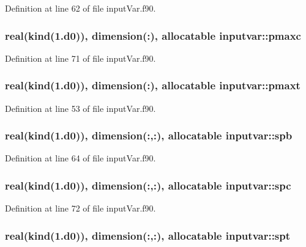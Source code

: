 Definition at line 62 of file input\-Var.\-f90.

\hypertarget{classinputvar_a59b745ef4d38979ee6715cbbdd3b7fdc}{
\subsubsection[{pmaxc}]{\setlength{\rightskip}{0pt plus 5cm}real(kind(1.d0)), dimension(\-:), allocatable inputvar\-::pmaxc}}\label{classinputvar_a59b745ef4d38979ee6715cbbdd3b7fdc}


Definition at line 71 of file input\-Var.\-f90.

\hypertarget{classinputvar_a4f173bcabd7673493639dfa0ad700822}{
\subsubsection[{pmaxt}]{\setlength{\rightskip}{0pt plus 5cm}real(kind(1.d0)), dimension(\-:), allocatable inputvar\-::pmaxt}}\label{classinputvar_a4f173bcabd7673493639dfa0ad700822}


Definition at line 53 of file input\-Var.\-f90.

\hypertarget{classinputvar_a831b2b0adb9e0bddc327d353012788e0}{
\subsubsection[{spb}]{\setlength{\rightskip}{0pt plus 5cm}real(kind(1.d0)), dimension(\-:,\-:), allocatable inputvar\-::spb}}\label{classinputvar_a831b2b0adb9e0bddc327d353012788e0}


Definition at line 64 of file input\-Var.\-f90.

\hypertarget{classinputvar_a16ce4ddae61b9940a768c5033f0e81a0}{
\subsubsection[{spc}]{\setlength{\rightskip}{0pt plus 5cm}real(kind(1.d0)), dimension(\-:,\-:), allocatable inputvar\-::spc}}\label{classinputvar_a16ce4ddae61b9940a768c5033f0e81a0}


Definition at line 72 of file input\-Var.\-f90.

\hypertarget{classinputvar_aea96dbeef4023d78701a4f3821152d1d}{
\subsubsection[{spt}]{\setlength{\rightskip}{0pt plus 5cm}real(kind(1.d0)), dimension(\-:,\-:), allocatable inputvar\-::spt}}\label{classinputvar_aea96dbeef4023d78701a4f3821152d1d}


